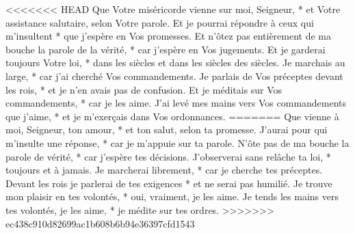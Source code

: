 <<<<<<< HEAD
Que Votre miséricorde vienne sur moi, Seigneur, * et Votre assistance salutaire, selon Votre parole.
\versseparator
Et je pourrai répondre à ceux qui m'insultent * que j'espère en Vos promesses.
\versseparator
Et n'ôtez pas entièrement de ma bouche la parole de la vérité, * car j'espère en Vos jugements.
\versseparator
Et je garderai toujours Votre loi, * dans les siècles et dans les siècles des siècles.
\versseparator
Je marchais au large, * car j'ai cherché Vos commandements.
\versseparator
Je parlais de Vos préceptes devant les rois, * et je n'en avais pas de confusion.
\versseparator
Et je méditais sur Vos commandements, * car je les aime.
\versseparator
J'ai levé mes mains vers Vos commandements que j'aime, * et je m'exerçais dans Vos ordonnances.
=======
Que vienne à moi, Seigneur, ton amour, *
et ton salut, selon ta promesse.
\versseparator
J’aurai pour qui m’insulte une réponse, *
car je m’appuie sur ta parole.
\versseparator
N’ôte pas de ma bouche la parole de vérité, *
car j’espère tes décisions.
\versseparator
J’observerai sans relâche ta loi, *
toujours et à jamais.
\versseparator
Je marcherai librement, *
car je cherche tes préceptes.
\versseparator
Devant les rois je parlerai de tes exigences *
et ne serai pas humilié.
\versseparator
Je trouve mon plaisir en tes volontés, *
oui, vraiment, je les aime.
\versseparator
Je tends les mains vers tes volontés, je les aime, *
je médite sur tes ordres.
>>>>>>> ec438c910d82699ac1b608b6b94e36397cfd1543
